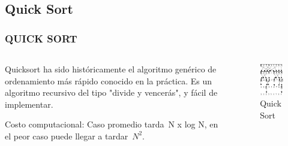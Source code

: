 \documentclass[
	11pt, %
]{beamer}
\begin{document}
\subsection{Quick Sort}
\begin{frame}
	\frametitle{QUICK SORT}
    \begin{columns}[t] %
		\begin{column}{0.45\textwidth} %
			
        Quicksort ha sido históricamente el algoritmo genérico de ordenamiento más rápido conocido en la práctica. Es un algoritmo recursivo del tipo "divide y vencerás", y fácil de implementar.

        Costo computacional: Caso promedio tarda N x log N, en el peor caso puede llegar a tardar $N^2$.

		\end{column}		
		\begin{column}{0.5\textwidth} %
			\begin{figure}
		      \includegraphics[width=0.8\linewidth]{quickSort.png}
		      \caption{Quick Sort}
	   \end{figure}
		
		\end{column}
	\end{columns}
\end{frame}
\end{document}
